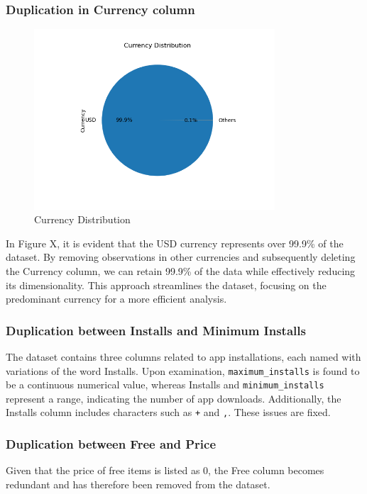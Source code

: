 \subsubsection{Duplication in Currency column}
\begin{figure}[h]
\centering
\includegraphics[width=0.8\textwidth]{docs//assets/currency.png}
\caption{Currency Distribution}
\end{figure}
In Figure X, it is evident that the USD currency represents over 99.9\% of the dataset. By removing observations in other currencies and subsequently deleting the Currency column, we can retain 99.9\% of the data while effectively reducing its dimensionality. This approach streamlines the dataset, focusing on the predominant currency for a more efficient analysis.

\subsubsection{Duplication between Installs and Minimum Installs}
The dataset contains three columns related to app installations, each named with variations of the word Installs. Upon examination, \texttt{maximum\_installs} is found to be a continuous numerical value, whereas Installs and \texttt{minimum\_installs} represent a range, indicating the number of app downloads. Additionally, the Installs column includes characters such as \texttt{+} and \texttt{,}. These issues are fixed.

\subsubsection{Duplication between Free and Price}
Given that the price of free items is listed as 0, the Free column becomes redundant and has therefore been removed from the dataset.

